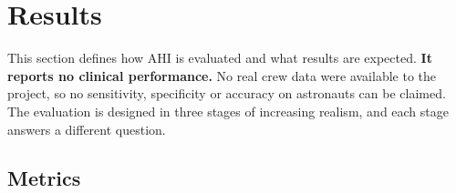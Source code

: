 \section{Results}
\label{sec:results}

This section defines how AHI is evaluated and what results are expected. \textbf{It reports no clinical performance.} No real crew data were available to the project, so no sensitivity, specificity or accuracy on astronauts can be claimed. The evaluation is designed in three stages of increasing realism, and each stage answers a different question.

\subsection{Metrics}
\label{subsec:metrics}

